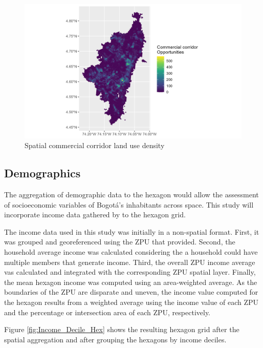 \documentclass[12pt, a4paper]{report}
\begin{document}
\begin{figure}[H]
    \centering
    \includegraphics[width=13cm]{Data/Results/Images/Opportunities_COD_21.png}
    \caption{Spatial commercial corridor land use density}
    \label{fig:Opportunities_Spatial}
\end{figure}


\subsection{Demographics}

The aggregation of demographic data to the hexagon would allow the assessment of socioeconomic variables of Bogotá's inhabitants across space. This study will incorporate income data gathered by \cite{secretariadistritaldeplaneacionMicrodatosEncuestaMultiproposito2023} to the hexagon grid.

The income data used in this study was initially in a non-spatial format. First, it was grouped and georeferenced using the ZPU that \cite{secretariadistritaldeplaneacionMicrodatosEncuestaMultiproposito2023} provided. Second, the household average income was calculated considering the a household could have multiple members that generate income. Third, the overall ZPU income average vas calculated and integrated with the corresponding ZPU spatial layer. Finally, the mean hexagon income was computed using an area-weighted average. As the boundaries of the ZPU are disparate and uneven, the income value computed for the hexagon results from a weighted average using the income value of each ZPU and the percentage or intersection area of each ZPU, respectively. 

Figure \ref{fig:Income_Decile_Hex} shows the resulting hexagon grid after the spatial aggregation and after grouping the hexagons by income deciles.
\end{document}
